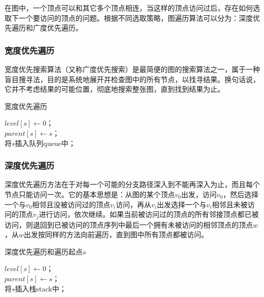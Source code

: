 在图中，一个顶点可以和其它多个顶点相连，当这样的顶点访问过后，存在如何选取下一个要访问的顶点的问题。根据不同选取策略，图遍历算法可以分为：深度优先遍历和广度优先遍历。

\subsubsection{宽度优先遍历}

宽度优先搜索算法（又称广度优先搜索）是最简便的图的搜索算法之一，属于一种盲目搜寻法，目的是系统地展开并检查图中的所有节点，以找寻结果。换句话说，它并不考虑结果的可能位置，彻底地搜索整张图，直到找到结果为止。


\begin{algorithm}[h] \label{alg:BFS}
\caption{宽度优先遍历}
\small
{}
$level[s] \gets 0$；\\
$parent[s] \gets s$；\\
将$s$插入队列queue中；\\
\end{algorithm}


\subsubsection{深度优先遍历}
深度优先遍历方法在于对每一个可能的分支路径深入到不能再深入为止，而且每个节点只能访问一次。它的基本思想是：从图的某个顶点$v_0$出发，访问$v_0$，然后选择一个与$v_0$相邻且没被访问过的顶点$v_i$访问，再从$v_i$出发选择一个与$v_i$相邻且未被访问的顶点$v_j$进行访问，依次继续。如果当前被访问过的顶点的所有邻接顶点都已被访问，则退回到已被访问的顶点序列中最后一个拥有未被访问的相邻顶点的顶点$w$，从$w$出发按同样的方法向前遍历，直到图中所有顶点都被访问。


\begin{algorithm}[h] \label{alg:DFS}
\caption{深度优先遍历和遍历起点$s$}
\small
{}
$level[s] \gets 0$；\\
$parent[s] \gets s$；\\
将$s$插入栈stack中；\\
\end{algorithm}



